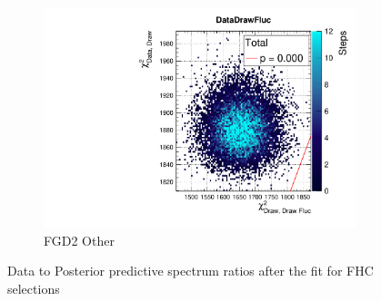 \begin{figure}[h]
\begin{subfigure}[t]{0.32\textwidth}
	\includegraphics[width=\textwidth, trim={20mm 6mm 4mm 11mm}, clip,page=50]{figures/mach3/data/postpred/2017b_NewData_NewDet_UpdXsecStep_2Xsec_4Det_5Flux_0_PostPred_procs}
	\caption{FGD2 Other}
\end{subfigure}
\caption{Data to Posterior predictive \pmu \cosmu spectrum ratios after the fit for FHC selections}
\label{fig:posterior_pred_data_fhc}
\end{figure}

